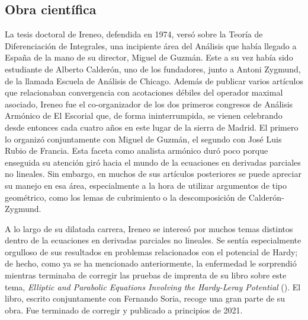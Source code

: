 \subsection*{Obra cient\'ifica}

La tesis doctoral de Ireneo, defendida en 1974, vers\'o sobre la Teor\'ia de Diferenciaci\'on de Integrales, una incipiente \'area del An\'alisis  que hab\'ia llegado a Espa\~na de la mano de su director, Miguel de Guzm\'an. Este  a su vez hab\'ia sido estudiante de Alberto Calder\'on, uno de los fundadores, junto a Antoni Zygmund,  de la llamada Escuela de An\'alisis de Chicago. Adem\'as de publicar varios art\'iculos que relacionaban convergencia con acotaciones d\'ebiles del operador maximal asociado, Ireneo fue el co-organizador de los dos primeros congresos de An\'alisis Arm\'onico de El Escorial que, de forma ininterrumpida, se vienen celebrando desde entonces cada cuatro a\~nos en este lugar de la sierra de Madrid. El primero lo organiz\'o conjuntamente con Miguel de Guzm\'an, el segundo con Jos\'e Luis Rubio de Francia. Esta faceta como analista arm\'onico dur\'o poco porque enseguida su atenci\'on gir\'o hacia el mundo de la ecuaciones en derivadas parciales no lineales. Sin embargo, en muchos de sus art\'iculos posteriores se puede apreciar su manejo  en esa \'area, especialmente a la hora de utilizar argumentos de tipo geom\'etrico, como los lemas de cubrimiento o la descomposici\'on de Calder\'on-Zygmund.

A lo largo de su dilatada carrera, Ireneo se interes\'o por muchos temas distintos dentro de la ecuaciones en derivadas parciales no lineales. Se sent\'ia especialmente orgulloso de sus resultados en problemas relacionados con el potencial de Hardy; de hecho, como ya se ha mencionado anteriormente, la enfermedad le sorprendi\'o mientras terminaba de corregir las pruebas de imprenta de su  libro sobre este tema, \textit{Elliptic  and Parabolic Equations Involving the Hardy-Leray Potential} (\cite{PSbook}). 
El libro, escrito conjuntamente con Fernando Soria,  recoge una gran parte de su obra. Fue terminado de corregir y publicado a principios de 2021.

